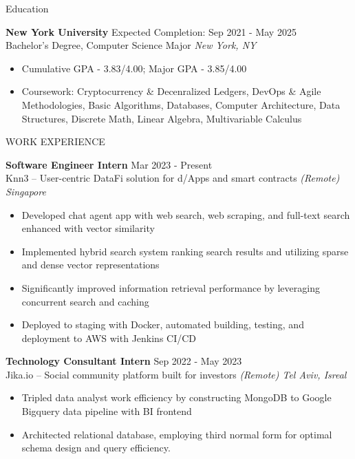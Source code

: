 \documentclass{resume} %
\begin{document}

\begin{rSection}{Education}

	\textbf{New York University} \hfill Expected Completion: Sep 2021 - May 2025\\
	Bachelor's Degree, Computer Science Major \hfill \textit{New York, NY}
	\begin{itemize}
		\item Cumulative GPA - 3.83/4.00; Major GPA - 3.85/4.00
		\item Coursework: Cryptocurrency \& Decenralized Ledgers, DevOps \& Agile Methodologies,
		      Basic Algorithms, Databases, Computer Architecture, Data Structures, Discrete Math,
		      Linear Algebra, Multivariable Calculus
	\end{itemize}

\end{rSection}


\begin{rSection}{WORK EXPERIENCE}

	\textbf{Software Engineer Intern} \hfill Mar 2023 - Present\\
	Knn3 – User-centric DataFi solution for d/Apps and smart contracts  \hfill \textit{(Remote) Singapore}
	\begin{itemize}
		\item Developed chat agent app with web search, web scraping, and full-text search enhanced with vector similarity
		\item Implemented hybrid search system ranking search results and utilizing sparse and dense vector representations
		\item Significantly improved information retrieval performance by leveraging concurrent search and caching
		\item Deployed to staging with Docker, automated building, testing, and deployment to AWS with Jenkins CI/CD
	\end{itemize}

	\textbf{Technology Consultant Intern} \hfill Sep 2022 - May 2023\\
	Jika.io – Social community platform built for investors \hfill \textit{(Remote) Tel Aviv, Isreal}
	\begin{itemize}
		\item Tripled data analyst work efficiency by constructing MongoDB to Google Bigquery data pipeline with BI frontend
		\item Architected relational database, employing third normal form for optimal schema design and query efficiency.
	\end{itemize}

\end{rSection}
\end{document}
